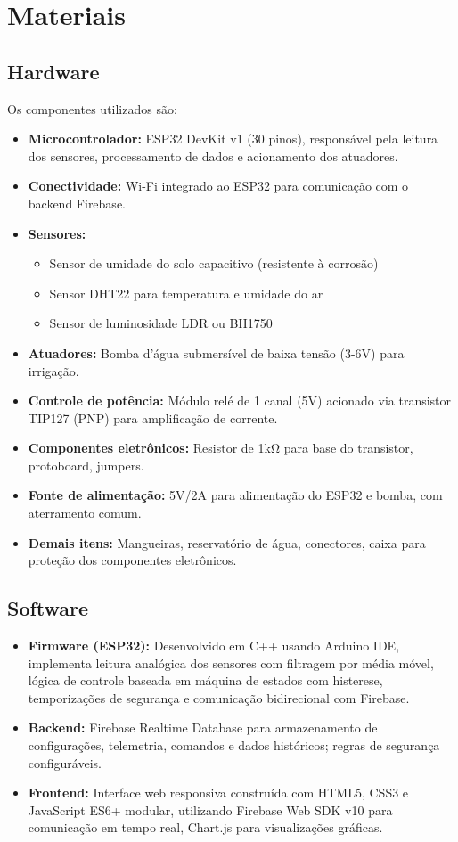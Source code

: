 \documentclass[twoside,english,brazilian]{UNISINOSmonografia}
\begin{document}
\section{Materiais}
\subsection{Hardware}
Os componentes utilizados são:
\begin{itemize}
    \item \textbf{Microcontrolador:} ESP32 DevKit v1 (30 pinos), responsável pela leitura dos sensores, processamento de dados e acionamento dos atuadores.
    \item \textbf{Conectividade:} Wi-Fi integrado ao ESP32 para comunicação com o backend Firebase.
    \item \textbf{Sensores:}
    \begin{itemize}
        \item Sensor de umidade do solo capacitivo (resistente à corrosão)
        \item Sensor DHT22 para temperatura e umidade do ar
        \item Sensor de luminosidade LDR ou BH1750
    \end{itemize}
    \item \textbf{Atuadores:} Bomba d'água submersível de baixa tensão (3-6V) para irrigação.
    \item \textbf{Controle de potência:} Módulo relé de 1 canal (5V) acionado via transistor TIP127 (PNP) para amplificação de corrente.
    \item \textbf{Componentes eletrônicos:} Resistor de 1kΩ para base do transistor, protoboard, jumpers.
    \item \textbf{Fonte de alimentação:} 5V/2A para alimentação do ESP32 e bomba, com aterramento comum.
    \item \textbf{Demais itens:} Mangueiras, reservatório de água, conectores, caixa para proteção dos componentes eletrônicos.
\end{itemize}

\subsection{Software}
\begin{itemize}
    \item \textbf{Firmware (ESP32):} Desenvolvido em C++ usando Arduino IDE, implementa leitura analógica dos sensores com filtragem por média móvel, lógica de controle baseada em máquina de estados com histerese, temporizações de segurança e comunicação bidirecional com Firebase.
    \item \textbf{Backend:} Firebase Realtime Database para armazenamento de configurações, telemetria, comandos e dados históricos; regras de segurança configuráveis.
    \item \textbf{Frontend:} Interface web responsiva construída com HTML5, CSS3 e JavaScript ES6+ modular, utilizando Firebase Web SDK v10 para comunicação em tempo real, Chart.js para visualizações gráficas.
\end{itemize}
\end{document}
